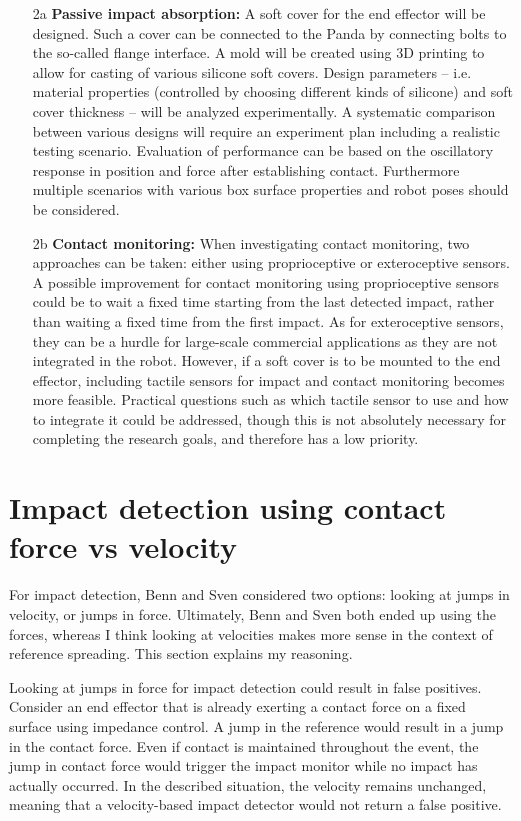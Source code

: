 \documentclass[11pt]{report}
\numberwithin{equation}{section}        %
\numberwithin{figure}{section}          %
\numberwithin{table}{section}           %
\begin{document}
\begin{enumerate}
   \item[2a] \textbf{Passive impact absorption:} A soft cover for the end effector will be designed. Such a cover can be connected to the Panda by connecting bolts to the so-called flange interface. A mold will be created using 3D printing to allow for casting of various silicone soft covers. Design parameters -- i.e. material properties (controlled by choosing different kinds of silicone) and soft cover thickness -- will be analyzed experimentally. A systematic comparison between various designs will require an experiment plan including a realistic testing scenario. Evaluation of performance can be based on the oscillatory response in position and force after establishing contact. Furthermore multiple scenarios with various box surface properties and robot poses should be considered.
  
  \item[2b] \textbf{Contact monitoring:} When investigating contact monitoring, two approaches can be taken: either using proprioceptive or exteroceptive sensors. A possible improvement for contact monitoring using proprioceptive sensors could be to wait a fixed time starting from the last detected impact, rather than waiting a fixed time from the first impact. As for exteroceptive sensors, they can be a hurdle for large-scale commercial applications as they are not integrated in the robot. However, if a soft cover is to be mounted to the end effector, including tactile sensors for impact and contact monitoring becomes more feasible. Practical questions such as which tactile sensor to use and how to integrate it could be addressed, though this is not absolutely necessary for completing the research goals, and therefore has a low priority.
  \end{enumerate}
  \newpage
  \section{Impact detection using contact force vs velocity}
  For impact detection, Benn and Sven considered two options: looking at jumps in velocity, or jumps in force. Ultimately, Benn and Sven both ended up using the forces, whereas I think looking at velocities makes more sense in the context of reference spreading. This section explains my reasoning.

  Looking at jumps in force for impact detection could result in false positives. Consider an end effector that is already exerting a contact force on a fixed surface using impedance control. A jump in the reference would result in a jump in the contact force. Even if contact is maintained throughout the event, the jump in contact force would trigger the impact monitor while no impact has actually occurred. In the described situation, the velocity remains unchanged, meaning that a velocity-based impact detector would not return a false positive.
\end{document}
